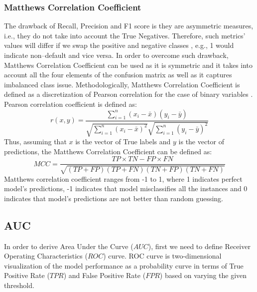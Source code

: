 \subsubsection{Matthews Correlation Coefficient}
The drawback of Recall, Precision and F1 score is they are asymmetric measures, i.e., they do not take into account the True Negatives.
Therefore, such metrics' values will differ if we swap the positive and negative classes \citep{chicco2020advantages}, e.g., 1 would indicate non--default and vice versa.
In order to overcome such drawback, Matthews Correlation Coefficient can be used as it is symmetric and it takes into account all the four elements of the confusion matrix as well as it captures imbalanced class issue.
Methodologically, Matthews Correlation Coefficient is defined as a discretization of Pearson correlation for the case of binary variables \citep{boughorbel2017optimal}.
Pearson correlation coefficient is defined as:
\begin{equation}\label{eq}
    r(x,y) = \frac{\sum\limits_{i=1}^n (x_i - \bar{x})(y_i - \bar{y})}{\sqrt{\sum\limits_{i=1}^n (x_i - \bar{x})^2} \sqrt{\sum\limits_{i=1}^n (y_i - \bar{y})^2}}
\end{equation}
Thus, assuming that $x$ is the vector of True labels and $y$ is the vector of predictions, the Matthews Correlation Coefficient can be defined as:
\begin{equation}\label{eq}
    MCC = \frac{TP \times TN - FP \times FN}{\sqrt{(TP + FP) (TP + FN) (TN + FP) (TN + FN)}}
\end{equation}
Matthews correlation coefficient ranges from -1 to 1, where 1 indicates perfect model's predictions, -1 indicates that model misclassifies all the instances and 0 indicates that model's predictions are not better than random guessing.
\subsection{AUC}

In order to derive Area Under the Curve ($AUC$), first we need to define Receiver Operating Characteristics ($ROC$) curve.
ROC curve is two-dimensional visualization of the model performance as a probability curve in terms of True Positive Rate ($TPR$) and False Positive Rate ($FPR$) based on varying the given threshold.

